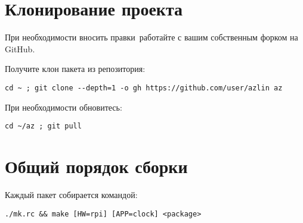 
\section{Клонирование проекта } \label{azclone}

При необходимости вносить правки\ работайте с вашим
собственным форком на GitHub.

Получите клон пакета из репозитория:

\begin{verbatim}
cd ~ ; git clone --depth=1 -o gh https://github.com/user/azlin az
\end{verbatim}

При необходимости обновитесь:

\begin{verbatim}
cd ~/az ; git pull
\end{verbatim}

\section{Общий порядок сборки}

Каждый пакет собирается командой:

\begin{verbatim}
./mk.rc && make [HW=rpi] [APP=clock] <package>
\end{verbatim}

